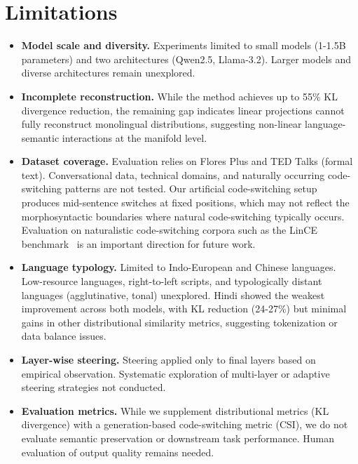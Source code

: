 \section*{Limitations}

\begin{itemize}
  \item \textbf{Model scale and diversity.} Experiments limited to small models (1-1.5B parameters) and two architectures (Qwen2.5, Llama-3.2). Larger models and diverse architectures remain unexplored.

  \item \textbf{Incomplete reconstruction.} While the method achieves up to 55\% KL divergence reduction, the remaining gap indicates linear projections cannot fully reconstruct monolingual distributions, suggesting non-linear language-semantic interactions at the manifold level.

  \item \textbf{Dataset coverage.} Evaluation relies on Flores Plus and TED Talks (formal text). Conversational data, technical domains, and naturally occurring code-switching patterns are not tested. Our artificial code-switching setup produces mid-sentence switches at fixed positions, which may not reflect the morphosyntactic boundaries where natural code-switching typically occurs. Evaluation on naturalistic code-switching corpora such as the LinCE benchmark~\cite{aguilar-etal-2020-lince} is an important direction for future work.

  \item \textbf{Language typology.} Limited to Indo-European and Chinese languages. Low-resource languages, right-to-left scripts, and typologically distant languages (agglutinative, tonal) unexplored. Hindi showed the weakest improvement across both models, with KL reduction (24-27\%) but minimal gains in other distributional similarity metrics, suggesting tokenization or data balance issues.

  \item \textbf{Layer-wise steering.} Steering applied only to final layers based on empirical observation. Systematic exploration of multi-layer or adaptive steering strategies not conducted.

  \item \textbf{Evaluation metrics.} While we supplement distributional metrics (KL divergence) with a generation-based code-switching metric (CSI), we do not evaluate semantic preservation or downstream task performance. Human evaluation of output quality remains needed.


\end{itemize}
